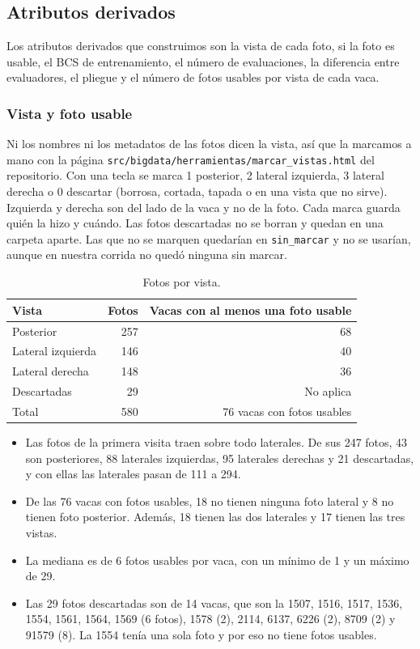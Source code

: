 \subsection{Atributos derivados}

Los atributos derivados que construimos son la vista de cada foto, si la foto es usable, el BCS de entrenamiento, el número de evaluaciones, la diferencia entre evaluadores, el pliegue y el número de fotos usables por vista de cada vaca.

\subsubsection*{Vista y foto usable}

Ni los nombres ni los metadatos de las fotos dicen la vista, así que la marcamos a mano con la página \nolinkurl{src/bigdata/herramientas/marcar_vistas.html} del repositorio. Con una tecla se marca 1 posterior, 2 lateral izquierda, 3 lateral derecha o 0 descartar (borrosa, cortada, tapada o en una vista que no sirve). Izquierda y derecha son del lado de la vaca y no de la foto. Cada marca guarda quién la hizo y cuándo. Las fotos descartadas no se borran y quedan en una carpeta aparte. Las que no se marquen quedarían en \nolinkurl{sin_marcar} y no se usarían, aunque en nuestra corrida no quedó ninguna sin marcar.

\begin{table}[H]
  \centering
  \caption{Fotos por vista.}
  \label{tab:vistas}
  \begin{tabular}{lrr}
    \toprule
    Vista & Fotos & Vacas con al menos una foto usable \\
    \midrule
    Posterior & 257 & 68 \\
    Lateral izquierda & 146 & 40 \\
    Lateral derecha & 148 & 36 \\
    Descartadas & 29 & No aplica \\
    \midrule
    Total & 580 & 76 vacas con fotos usables \\
    \bottomrule
  \end{tabular}
\end{table}

\begin{itemize}
  \item Las fotos de la primera visita traen sobre todo laterales. De sus 247 fotos, 43 son posteriores, 88 laterales izquierdas, 95 laterales derechas y 21 descartadas, y con ellas las laterales pasan de 111 a 294.
  \item De las 76 vacas con fotos usables, 18 no tienen ninguna foto lateral y 8 no tienen foto posterior. Además, 18 tienen las dos laterales y 17 tienen las tres vistas.
  \item La mediana es de 6 fotos usables por vaca, con un mínimo de 1 y un máximo de 29.
  \item Las 29 fotos descartadas son de 14 vacas, que son la 1507, 1516, 1517, 1536, 1554, 1561, 1564, 1569 (6 fotos), 1578 (2), 2114, 6137, 6226 (2), 8709 (2) y 91579 (8). La 1554 tenía una sola foto y por eso no tiene fotos usables.
\end{itemize}

